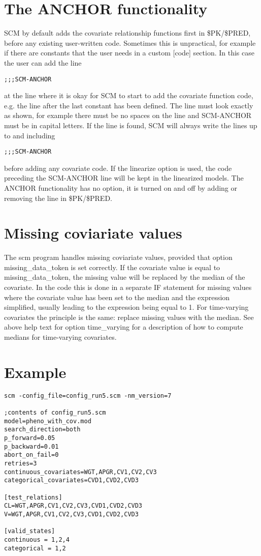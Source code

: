 \documentclass[a4paper,12pt]{article}
\begin{document}
\section{The ANCHOR functionality}
SCM by default adds the covariate relationship functions first in \$PK/\$PRED, before any existing user-written code. Sometimes this is unpractical, for example if there are constants that the user needs in a custom [code] section. In this case the user can add the line
\begin{verbatim}
;;;SCM-ANCHOR
\end{verbatim}
at the line where it is okay for SCM to start to add the covariate function code, e.g. the line after the last constant has been defined. The line must look exactly as shown, for example there must be no spaces on the line and SCM-ANCHOR must be in capital letters. If the line is found, SCM will always write the lines up to and including 
\begin{verbatim}
;;;SCM-ANCHOR
\end{verbatim}
before adding any covariate code. If the linearize option is used, the code preceding the SCM-ANCHOR line will be kept in the linearized models. The ANCHOR functionality has no option, it is turned on and off by adding or removing the line in \$PK/\$PRED.

\section{Missing coviariate values}
The scm program handles missing coviariate values, provided that option missing\_data\_token is set correctly. If the covariate value is equal to missing\_data\_token, the missing value will be replaced by the median of the covariate. In the code this is done in a separate IF statement for missing values where the covariate value has been set to the median and the expression simplified, usually leading to the expression being equal to 1. For time-varying covariates the principle is the same: replace missing values with the median. See above help text for option time\_varying for a description of how to compute medians for time-varying covariates.  

\section{Example}
\begin{verbatim}
scm -config_file=config_run5.scm -nm_version=7

;contents of config_run5.scm
model=pheno_with_cov.mod
search_direction=both
p_forward=0.05
p_backward=0.01
abort_on_fail=0
retries=3
continuous_covariates=WGT,APGR,CV1,CV2,CV3
categorical_covariates=CVD1,CVD2,CVD3

[test_relations]
CL=WGT,APGR,CV1,CV2,CV3,CVD1,CVD2,CVD3
V=WGT,APGR,CV1,CV2,CV3,CVD1,CVD2,CVD3

[valid_states]
continuous = 1,2,4
categorical = 1,2
\end{verbatim}
\end{document}
